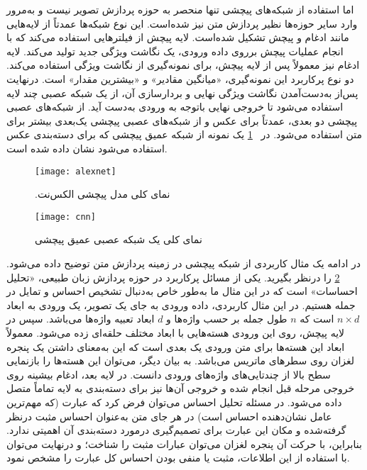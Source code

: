   
 اما استفاده از شبکه‌های
 پیچشی تنها منحصر به حوزه پردازش تصویر نیست و به‌مرور وارد سایر حوزه‌ها نظیر پردازش متن نیز شده‌است.
 این نوع شبکه‌ها عمدتاً از لایه‌هایی مانند ادغام و پیچش تشکیل شده‌است. لایه پیچش از فیلترهایی استفاده می‌کند که با
 انجام عملیات پیچش برروی داده ورودی، یک نگاشت ویژگی جدید تولید می‌کند. لایه ادغام نیز معمولاً پس از لایه پیچش،
 برای نمونه‌گیری از نگاشت ویژگی استفاده می‌کند. دو نوع پرکاربرد این نمونه‌گیری، «میانگین مقادیر» و «بیشترین مقدار» است. درنهایت پس‌از به‌دست‌آمدن نگاشت ویژگی نهایی و بردارسازی آن، از یک شبکه عصبی چند لایه استفاده می‌شود تا خروجی
 نهایی باتوجه ‌به ورودی به‌دست آید. از شبکه‌های عصبی پیچشی دو‌ بعدی، عمدتاً برای عکس و از شبکه‌های عصبی پیچشی یک‌بعدی بیشتر برای متن استفاده می‌شود. در \figurename~\ref{fig.alexnet} یک نمونه از شبکه عمیق پیچشی که برای دسته‌بندی عکس استفاده می‌شود نشان داده شده ‌است.

\begin{figure}[!h]
\texttt{[image: alexnet]}
\centering
\caption{.نمای کلی مدل پیچشی الکس‌نت \citep{krizhevsky2012imagenet}}
\label{fig.alexnet}
\end{figure}

\vspace{3mm}

\begin{figure}[!h]
\texttt{[image: cnn]}
\centering
\caption{نمای کلی یک شبکه عصبی عمیق پیچشی \citep{le2017convolutional}}
\label{fig.sentimentAnalyzing}
\end{figure}

در ادامه یک مثال کاربردی از شبکه پیچشی در زمینه پردازش متن توضیح داده می‌شود. \figurename~\ref{fig.sentimentAnalyzing} را درنظر بگیرید. یکی از مسائل  پرکاربرد در حوزه پردازش زبان طبیعی، «تحلیل احساسات» است که در این مثال ما به‌طور خاص  به‌دنبال تشخیص احساس و تمایل در جمله  هستیم. در این مثال کاربردی، داده ورودی به جای یک تصویر، یک ورودی به ابعاد  $n \times d$  است که $n$ طول جمله بر حسب واژه‌ها و $d$ ابعاد تعبیه واژه‌ها می‌باشد. سپس در لایه پیچش، روی این ورودی هسته‌هایی با ابعاد مختلف حلقه‌ای زده می‌شود. معمولاً ابعاد این هسته‌ها برای متن ورودی یک بعدی است که این به‌معنای داشتن یک پنجره لغزان روی سطرهای ماتریس می‌باشد. به بیان دیگر، می‌توان این هسته‌ها را بازنمایی سطح بالا از چندتایی‌های واژه‌های ورودی دانست. در لایه بعد، ادغام بیشینه روی خروجی مرحله قبل  انجام شده و خروجی آن‌ها نیز برای دسته‌بندی به لایه تماماً متصل داده می‌شود. در مسئله تحلیل احساس می‌توان فرض کرد که عبارت  (که مهم‌ترین عامل نشان‌دهنده احساس است)  در هر جای متن  به‌عنوان احساس مثبت درنظر گرفته‌شده و مکان این عبارت برای تصمیم‌گیری درمورد دسته‌بندی آن اهمیتی ندارد. بنابراین، با حرکت آن پنجره لغزان می‌توان عبارات مثبت را شناخت؛ و درنهایت می‌توان با استفاده از این اطلاعات، مثبت یا منفی بودن احساس کل عبارت را مشخص نمود.

